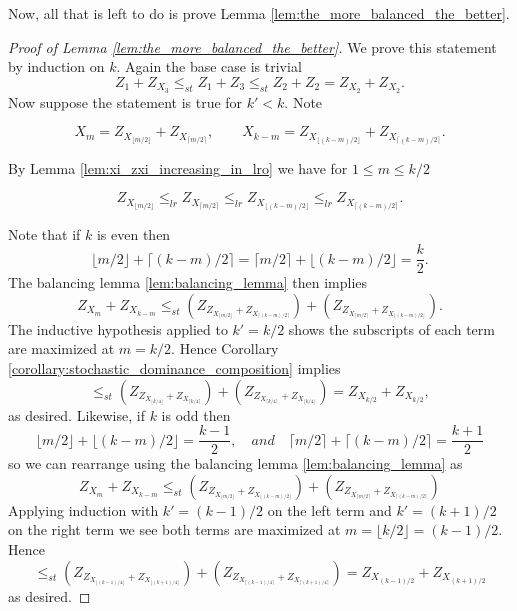\documentclass[10pt,oneside,reqno]{article}
\theoremstyle{plain}
\theoremstyle{definition}
\numberwithin{equation}{section}
\renewcommand{\leq}{\leqslant}
\begin{document}
\noindent Now, all that is left to do is prove Lemma \ref{lem:the_more_balanced_the_better}. 


\begin{proof}[Proof of Lemma \ref{lem:the_more_balanced_the_better}]

 We prove this statement by induction on $k$. Again the base case is trivial
    \[Z_1 + Z_{X_3} \leq_{st} Z_1 + Z_3 \leq_{st} Z_2 + Z_2 = Z_{X_2} + Z_{X_2}.\]
    \noindent Now suppose the statement is true for $k' < k$. Note
    
    \[X_m = Z_{X_{\lfloor m/2 \rfloor}} + Z_{X_{\lceil m/2 \rceil}}, \qquad X_{k-m} = Z_{X_{\lfloor (k-m)/2 \rfloor}} + Z_{X_{\lceil (k-m)/2 \rceil}}.\]

    \noindent By Lemma \ref{lem:xi_zxi_increasing_in_lro} we have for $1 \leq m \leq k/2$

    \[Z_{X_{\lfloor m/2 \rfloor}} \leq_{lr} Z_{X_{\lceil m/2 \rceil}} \leq_{lr} Z_{X_{\lfloor (k-m)/2 \rfloor}} \leq_{lr} Z_{X_{\lceil (k-m)/2 \rceil}}. \]
    
    \noindent Note that if $k$ is even then
    \[\lfloor m/2 \rfloor + \lceil (k-m)/2 \rceil = \lceil m/2 \rceil + \lfloor (k-m)/2 \rfloor = \frac{k}{2}.\]
    \noindent The balancing lemma \ref{lem:balancing_lemma} then implies
    \[Z_{X_m} + Z_{X_{k-m}} \leq_{st} \left(Z_{Z_{X_{\lfloor m/2 \rfloor}} + Z_{X_{\lceil (k-m)/2 \rceil}}}\right) + \left(Z_{Z_{X_{\lceil m/2 \rceil}} + Z_{X_{\lfloor (k-m)/2 \rfloor}}}\right).\]
    \noindent The inductive hypothesis applied to $k' = k/2$ shows the subscripts of each term are maximized at $m = k/2$. Hence Corollary \ref{corollary:stochastic_dominance_composition} implies
    \[ \leq_{st} \left(Z_{Z_{X_{\lfloor k/4 \rfloor}} + Z_{X_{\lceil k/4 \rceil}}}\right) + \left(Z_{Z_{X_{\lceil k/4 \rceil}} + Z_{X_{\lfloor k/4 \rfloor}}}\right) = Z_{X_{k/2}} + Z_{X_{k/2}},\]
    \noindent as desired. Likewise, if $k$ is odd then
    \[\lfloor m/2 \rfloor + \lfloor (k-m)/2 \rfloor = \frac{k-1}{2}, \quad and \quad \lceil m/2 \rceil + \lceil (k-m)/2 \rceil = \frac{k+1}{2}\]
    \noindent so we can rearrange using the balancing lemma \ref{lem:balancing_lemma} as
    \[Z_{X_m} + Z_{X_{k-m}} \leq_{st} \left(Z_{Z_{X_{\lfloor m/2 \rfloor}} + Z_{X_{\lfloor (k-m)/2 \rfloor}}}\right) + \left(Z_{Z_{X_{\lceil m/2 \rceil}} + Z_{X_{\lceil (k-m)/2 \rceil}}}\right)\]
    \noindent Applying induction with $k' = (k-1)/2$ on the left term and $k' = (k+1)/2$ on the right term we see both terms are maximized at $m = \lfloor k /2 \rfloor = (k-1)/2$. Hence
    \[\leq_{st} \left(Z_{Z_{X_{\lfloor (k-1)/4 \rfloor}} + Z_{X_{\lfloor (k+1)/4 \rfloor}}}\right) + \left(Z_{Z_{X_{\lceil (k-1)/4 \rceil}} + Z_{X_{\lceil (k+1)/4 \rceil}}}\right) = Z_{X_{(k-1)/2}} + Z_{X_{(k+1) / 2}}\]
    \noindent as desired. 
    \end{proof}
\end{document}
